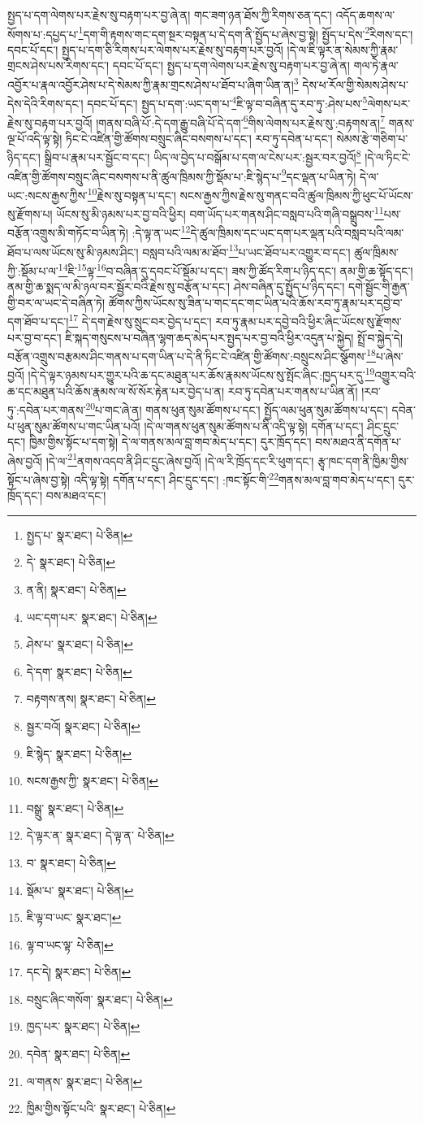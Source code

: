 སྤྱད་པ་དག་ལེགས་པར་རྗེས་སུ་བརྟག་པར་བྱ་ཞེ་ན། གང་ཟག་ཉན་ཐོས་ཀྱི་རིགས་ཅན་དང་། འདོད་ཆགས་ལ་སོགས་པ་:དཔྱད་པ་\footnote{སྤྱད་པ་  སྣར་ཐང་།  པེ་ཅིན། }དག་གི་རྟགས་གང་དག་སྔར་བསྟན་པ་དེ་དག་ནི་སྤྱོད་པ་ཞེས་བྱ་སྟེ། སྤྱོད་པ་དེས་\footnote{དེ་  སྣར་ཐང་།  པེ་ཅིན། }རིགས་དང་། དབང་པོ་དང་། སྤྱད་པ་དག་ཅི་རིགས་པར་ལེགས་པར་རྗེས་སུ་བརྟག་པར་བྱའོ། །དེ་ལ་ཇི་ལྟར་ན་སེམས་ཀྱི་རྣམ་གྲངས་ཤེས་པས་རིགས་དང་། དབང་པོ་དང་། སྤྱད་པ་དག་ལེགས་པར་རྗེས་སུ་བརྟག་པར་བྱ་ཞེ་ན། གལ་ཏེ་རྣལ་འབྱོར་པ་རྣལ་འབྱོར་ཤེས་པ་དེ་སེམས་ཀྱི་རྣམ་གྲངས་ཤེས་པ་ཐོབ་པ་ཞིག་ཡིན་ན།\footnote{ན་ནི།  སྣར་ཐང་།  པེ་ཅིན། } དེས་ཕ་རོལ་གྱི་སེམས་ཤེས་པ་དེས་དེའི་རིགས་དང་། དབང་པོ་དང་། སྤྱད་པ་དག་:ཡང་དག་པ་\footnote{ཡང་དག་པར་  སྣར་ཐང་།  པེ་ཅིན། }ཇི་ལྟ་བ་བཞིན་དུ་རབ་ཏུ་:ཤེས་པས་\footnote{ཤེས་པ་  སྣར་ཐང་།  པེ་ཅིན། }ལེགས་པར་རྗེས་སུ་བརྟག་པར་བྱའོ། །གནས་བཞི་པོ་:དེ་དག་རྒྱུ་བཞི་པོ་དེ་དག་\footnote{དེ་དག་  སྣར་ཐང་།  པེ་ཅིན། }གིས་ལེགས་པར་རྗེས་སུ་:བརྟགས་ན།\footnote{བརྟགས་ནས།  སྣར་ཐང་།  པེ་ཅིན། } གནས་ལྔ་པོ་འདི་ལྟ་སྟེ། ཏིང་ངེ་འཛིན་གྱི་ཚོགས་བསྲུང་ཞིང་བསགས་པ་དང་། རབ་ཏུ་དབེན་པ་དང་། སེམས་རྩེ་གཅིག་པ་ཉིད་དང་། སྒྲིབ་པ་རྣམ་པར་སྦྱོང་བ་དང་། ཡིད་ལ་བྱེད་པ་བསྒོམ་པ་དག་ལ་ངེས་པར་:སྦྱར་བར་བྱའོ།\footnote{སྦྱར་བའོ།  སྣར་ཐང་།  པེ་ཅིན། } །དེ་ལ་ཏིང་ངེ་འཛིན་གྱི་ཚོགས་བསྲུང་ཞིང་བསགས་པ་ནི་ཚུལ་ཁྲིམས་ཀྱི་སྡོམ་པ་:ཇི་སྙེད་པ་\footnote{ཇི་སྙེད་  སྣར་ཐང་།  པེ་ཅིན། }དང་ལྡན་པ་ཡིན་ཏེ། དེ་ལ་ཡང་:སངས་རྒྱས་ཀྱིས་\footnote{སངས་རྒྱས་ཀྱི་  སྣར་ཐང་།  པེ་ཅིན། }རྗེས་སུ་བསྟན་པ་དང་། སངས་རྒྱས་ཀྱིས་རྗེས་སུ་གནང་བའི་ཚུལ་ཁྲིམས་ཀྱི་ཕུང་པོ་ཡོངས་སུ་རྫོགས་པ། ཡོངས་སུ་མི་ཉམས་པར་བྱ་བའི་ཕྱིར། བག་ཡོད་པར་གནས་ཤིང་བསླབ་པའི་གཞི་བསྒྲུབས་\footnote{བསྒྲུ་  སྣར་ཐང་།  པེ་ཅིན། }པས་བརྩོན་འགྲུས་མི་གཏོང་བ་ཡིན་ཏེ། :དེ་ལྟ་ན་ཡང་\footnote{དེ་ལྟར་ན་  སྣར་ཐང་། དེ་ལྟ་ན་  པེ་ཅིན། }དེ་ཚུལ་ཁྲིམས་དང་ཡང་དག་པར་ལྡན་པའི་བསླབ་པའི་ལམ་ཐོབ་པ་ལས་ཡོངས་སུ་མི་ཉམས་ཤིང་། བསླབ་པའི་ལམ་མ་ཐོབ་\footnote{བ་  སྣར་ཐང་།  པེ་ཅིན། }པ་ཡང་ཐོབ་པར་འགྱུར་བ་དང་། ཚུལ་ཁྲིམས་ཀྱི་:སྡོམ་པ་ལ་\footnote{སྡོམ་པ་  སྣར་ཐང་།  པེ་ཅིན། }ཇི་\footnote{ཇི་ལྟ་བ་ཡང་  སྣར་ཐང་། }ལྟ་\footnote{ལྟ་བ་ཡང་ལྟ་  པེ་ཅིན། }བ་བཞིན་དུ་དབང་པོ་སྡོམ་པ་དང་། ཟས་ཀྱི་ཚོད་རིག་པ་ཉིད་དང་། ནམ་གྱི་ཆ་སྟོད་དང་། ནམ་གྱི་ཆ་སྨད་ལ་མི་ཉལ་བར་སྦྱོར་བའི་རྗེས་སུ་བརྩོན་པ་དང་། ཤེས་བཞིན་དུ་སྤྱོད་པ་ཉིད་དང་། དགེ་སྦྱོང་གི་རྒྱན་གྱི་བར་ལ་ཡང་དེ་བཞིན་ཏེ། ཚོགས་ཀྱིས་ཡོངས་སུ་ཟིན་པ་གང་དང་གང་ཡིན་པའི་ཆོས་རབ་ཏུ་རྣམ་པར་དབྱེ་བ་དག་ཐོབ་པ་དང་།\footnote{དང་དེ།  སྣར་ཐང་།  པེ་ཅིན། } དེ་དག་རྗེས་སུ་སྲུང་བར་བྱེད་པ་དང་། རབ་ཏུ་རྣམ་པར་དབྱེ་བའི་ཕྱིར་ཞིང་ཡོངས་སུ་རྫོགས་པར་བྱ་བ་དང་། ཇི་སྐད་གསུངས་པ་བཞིན་ལྷག་ཆད་མེད་པར་སྤྱད་པར་བྱ་བའི་ཕྱིར་འདུན་པ་སྐྱེད། སྤྲོ་བ་སྐྱེད་དེ། བརྩོན་འགྲུས་བརྩམས་ཤིང་གནས་པ་དག་ཡིན་པ་དེ་ནི་ཏིང་ངེ་འཛིན་གྱི་ཚོགས་:བསྲུངས་ཤིང་སྩོགས་\footnote{བསྲུང་ཞིང་གསོག་  སྣར་ཐང་།  པེ་ཅིན། }པ་ཞེས་བྱའོ། །དེ་དེ་ལྟར་ཉམས་པར་གྱུར་པའི་ཆ་དང་མཐུན་པར་ཆོས་རྣམས་ཡོངས་སུ་སྤོང་ཞིང་:ཁྱད་པར་དུ་\footnote{ཁྱད་པར་  སྣར་ཐང་།  པེ་ཅིན། }འགྱུར་བའི་ཆ་དང་མཐུན་པའི་ཆོས་རྣམས་ལ་སོ་སོར་རྟེན་པར་བྱེད་པ་ན། རབ་ཏུ་དབེན་པར་གནས་པ་ཡིན་ནོ། །རབ་ཏུ་:དབེན་པར་གནས་\footnote{དབེན་  སྣར་ཐང་།  པེ་ཅིན། }པ་གང་ཞེ་ན། གནས་ཕུན་སུམ་ཚོགས་པ་དང་། སྤྱོད་ལམ་ཕུན་སུམ་ཚོགས་པ་དང་། དབེན་པ་ཕུན་སུམ་ཚོགས་པ་གང་ཡིན་པའོ། །དེ་ལ་གནས་ཕུན་སུམ་ཚོགས་པ་ནི་འདི་ལྟ་སྟེ། དགོན་པ་དང་། ཤིང་དྲུང་དང་། ཁྱིམ་གྱིས་སྟོང་པ་དག་སྟེ། དེ་ལ་གནས་མལ་བླ་གབ་མེད་པ་དང་། དུར་ཁྲོད་དང་། བས་མཐའ་ནི་དགོན་པ་ཞེས་བྱའོ། །དེ་ལ་\footnote{ལ་གནས་  སྣར་ཐང་།  པེ་ཅིན། }ནགས་འདབ་ནི་ཤིང་དྲུང་ཞེས་བྱའོ། །དེ་ལ་རི་ཁྲོད་དང་རི་ཕུག་དང་། རྩྭ་ཁང་དག་ནི་ཁྱིམ་གྱིས་སྟོང་པ་ཞེས་བྱ་སྟེ། འདི་ལྟ་སྟེ། དགོན་པ་དང་། ཤིང་དྲུང་དང་། :ཁང་སྟོང་གི་\footnote{ཁྱིམ་གྱིས་སྟོང་པའི་  སྣར་ཐང་།  པེ་ཅིན། }གནས་མལ་བླ་གབ་མེད་པ་དང་། དུར་ཁྲོད་དང་། བས་མཐའ་དང་། 